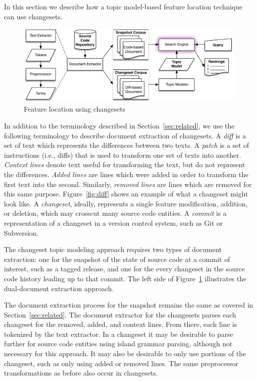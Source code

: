 
In this section we describe how a topic model-based feature location
technique can use changesets.



\begin{figure}
\vspace{2mm}
\centerline{\includegraphics[width=.75\textwidth]{figures/changeset-flt}}
\caption{Feature location using changesets}
\label{fig:changeset}
\vspace{-2mm}
\end{figure}

In addition to the terminology described in Section~\ref{sec:related},
we use the following terminology to describe document extraction of changesets.
A \textit{diff} is a set of text which represents the differences between two texts.
A \textit{patch} is a set of instructions (i.e., diffs) that is used to transform one set of texts into another.
\textit{Context lines} denote text useful for transforming the text, but do not represent the differences.
\textit{Added lines} are lines which were added in order to transform the first text into the second.
Similarly, \textit{removed lines} are lines which are removed for this same purpose.
Figure~\ref{fig:diff} shows an example of what a changeset might look like.
A \textit{changeset}, ideally, represents a single feature modification,
addition, or deletion, which may crosscut many source code entities.
A \textit{commit} is a representation of a changeset in a version control system, such as Git or Subversion.

The changeset topic modeling approach requires two types of document extraction:
one for the snapshot of the state of source code at a commit of interest, such as a tagged release,
and one for the every changeset in the source code history leading up to that commit.
The left side of Figure~\ref{fig:changeset} illustrates the dual-document extraction approach.

The document extraction process for the snapshot remains the same as covered in Section~\ref{sec:related}.
The document extractor for the changesets parses each changeset for the removed, added, and context lines.
From there, each line is tokenized by the text extractor.
In a changeset it may be desirable to parse further for source code entities using island grammar parsing\needcite,
although not necessary for this approach.
It may also be desirable to only use portions of the changeset, such as only using added or removed lines.
The same preprocessor transformations as before also occur in changesets.

